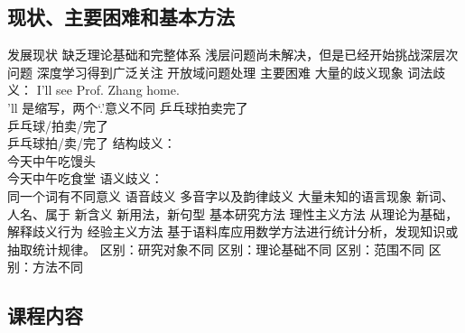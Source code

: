 \documentclass{ctexart}
\begin{document}
\subsection{现状、主要困难和基本方法}
\begin{outline}
    \1 发展现状
        \2 缺乏理论基础和完整体系
        \2 浅层问题尚未解决，但是已经开始挑战深层次问题
        \2 深度学习得到广泛关注
        \2 开放域问题处理
    \1 主要困难
        \2 大量的歧义现象
            \3 词法歧义：
                \4 I'll see Prof. Zhang home. \\
                    'll 是缩写，两个`.'意义不同
                \4 乒乓球拍卖完了 \\
                    乒乓球/拍卖/完了 \\
                    乒乓球拍/卖/完了
            \3 结构歧义： \\
                今天中午吃馒头 \\
                今天中午吃食堂 
            \3 语义歧义： \\
                同一个词有不同意义
            \3 语音歧义
            \3 多音字以及韵律歧义
        \2 大量未知的语言现象
            \3 新词、人名、属于
            \3 新含义
            \3 新用法，新句型
    \1 基本研究方法
        \2 理性主义方法
            \3 从理论为基础，解释歧义行为
        \2 经验主义方法
            \3 基于语料库应用数学方法进行统计分析，发现知识或抽取统计规律。
        \2 区别：研究对象不同
        \2 区别：理论基础不同
        \2 区别：范围不同
        \2 区别：方法不同
\end{outline}
\subsection{课程内容}
\end{document}
